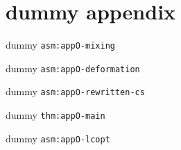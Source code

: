 \chapter{dummy appendix}\label{app:appO}
\begin{assumption}\label{asm:appO-mixing}dummy \texttt{asm:appO-mixing}\end{assumption}
\begin{assumption}\label{asm:appO-deformation}dummy \texttt{asm:appO-deformation}\end{assumption}
\begin{assumption}\label{asm:appO-rewritten-cs}dummy \texttt{asm:appO-rewritten-cs}\end{assumption}
\begin{theorem}\label{thm:appO-main}dummy \texttt{thm:appO-main}\end{theorem}
\begin{assumption}\label{asm:appO-lcopt}dummy \texttt{asm:appO-lcopt}\end{assumption}
\endgroup
